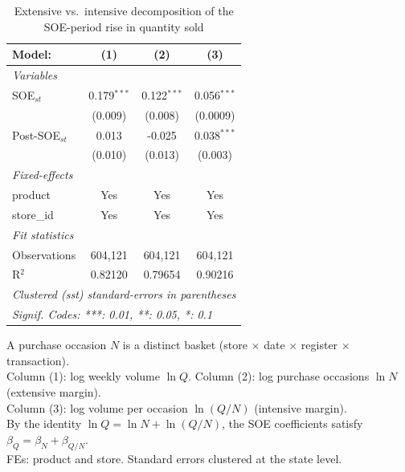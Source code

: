 
\begin{table}[htbp]
   \caption{\label{tab:extensive_intensive} Extensive vs.\ intensive decomposition of the SOE-period rise in quantity sold}
   \centering
   \begin{tabular}{lccc}
      \tabularnewline \midrule \midrule
      Model:          & (1)           & (2)           & (3)\\  
      \midrule
      \emph{Variables}\\
      SOE$_{st}$      & 0.179$^{***}$ & 0.122$^{***}$ & 0.056$^{***}$\\   
                      & (0.009)       & (0.008)       & (0.0009)\\   
      Post-SOE$_{st}$ & 0.013         & -0.025        & 0.038$^{***}$\\   
                      & (0.010)       & (0.013)       & (0.003)\\   
      \midrule
      \emph{Fixed-effects}\\
      product         & Yes           & Yes           & Yes\\  
      store\_id       & Yes           & Yes           & Yes\\  
      \midrule
      \emph{Fit statistics}\\
      Observations    & 604,121       & 604,121       & 604,121\\  
      R$^2$           & 0.82120       & 0.79654       & 0.90216\\  
      \midrule \midrule
      \multicolumn{4}{l}{\emph{Clustered (sst) standard-errors in parentheses}}\\
      \multicolumn{4}{l}{\emph{Signif. Codes: ***: 0.01, **: 0.05, *: 0.1}}\\
   \end{tabular}
   
   \par \raggedright 
   A purchase occasion $N$ is a distinct basket (store $\times$ date $\times$ register $\times$ transaction).\\
   Column (1): log weekly volume $\ln Q$. Column (2): log purchase occasions $\ln N$ (extensive margin).\\
   Column (3): log volume per occasion $\ln(Q/N)$ (intensive margin).\\
   By the identity $\ln Q = \ln N + \ln(Q/N)$, the SOE coefficients satisfy $\beta_Q = \beta_N + \beta_{Q/N}$.\\
   FEs: product and store. Standard errors clustered at the state level.
\end{table}


